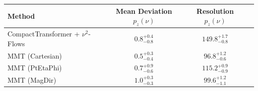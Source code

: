     \begin{tabular}{lccc}
        \toprule
        Method & Mean Deviation $p_{z}(\nu)$ & Resolution $p_{z}(\nu)$ \\
        \midrule
        CompactTransformer + $\nu^2$-Flows & $0.8^{+0.4}_{-0.8}$ & $149.8^{+1.7}_{-0.8}$ \\
        MMT (Cartesian) & $0.5^{+0.3}_{-0.4}$ & $96.8^{+1.2}_{-0.6}$ \\
        MMT (PtEtaPhi) & $0.7^{+0.9}_{-0.6}$ & $115.2^{+0.9}_{-0.9}$ \\
        MMT (MagDir) & $1.0^{+0.3}_{-0.3}$ & $99.6^{+1.2}_{-1.1}$ \\
        \bottomrule
    \end{tabular}